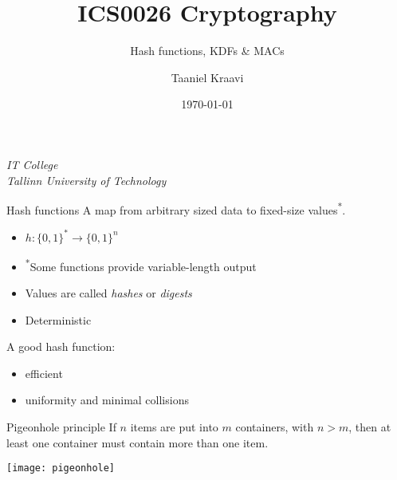 \usepackage[dvipsnames]{xcolor}

\usepackage{fancyvrb}


\usepackage{graphicx}
\graphicspath{ {../../images/} }

\usepackage{pgfplots}
\usetikzlibrary{positioning,calc,external}


\setmonofont{cmuntt}

\usetikzlibrary{positioning,calc}
\graphicspath{ {../../images/} }

\title{ICS0026 Cryptography}
\subtitle{Hash functions, KDFs \& MACs}
\date{\today}
\author{Taaniel Kraavi}
\institute%
{%
    \textit{IT College}\\
    \textit{Tallinn University of Technology}
}


\begin{frame}
  \titlepage
\end{frame}

\begin{frame}{Hash functions}
  \pause
  A map from arbitrary sized data to fixed-size values\textsuperscript{*}.
  \begin{itemize}[<+(1)->]
    \item $h:\{0,1\}^* \to \{0,1\}^n$
    \item \textsuperscript{*}Some functions provide variable-length output
    \item Values are called \emph{hashes} or \emph{digests}
    \item Deterministic
  \end{itemize}

  \vspace*{1em}

  \pause
  A good hash function:
  \begin{itemize}[<+(1)->]
    \item efficient
    \item uniformity and minimal collisions
  \end{itemize}
\end{frame}

\begin{frame}{Pigeonhole principle}
  \pause
  If $n$ items are put into $m$ containers, with $n > m$, then at least one container must contain more than one item.

  \vspace*{1em}

  \pause
  \begin{center}
    \texttt{[image: pigeonhole]}
  \end{center}
\end{frame}

